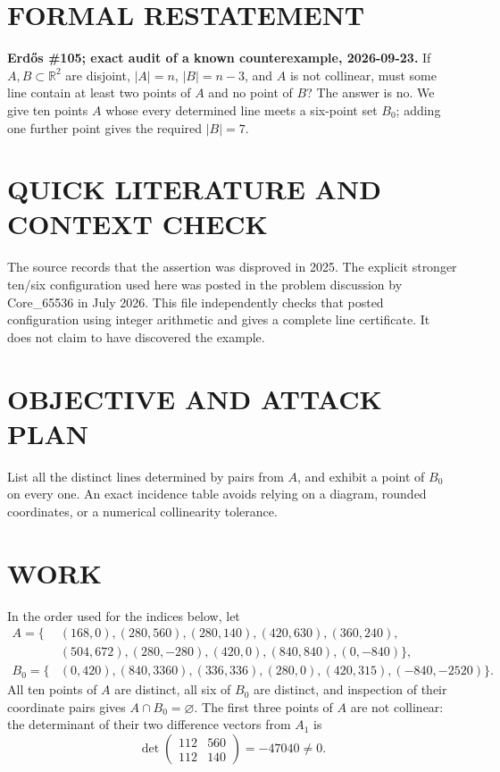 \section{FORMAL RESTATEMENT}
\textbf{Erd\H{o}s \#105; exact audit of a known counterexample, 2026-09-23.}
If $A,B\subset\mathbb R^2$ are disjoint, $|A|=n$, $|B|=n-3$, and $A$ is not collinear, must some line contain at least two points of $A$ and no point of $B$? The answer is no. We give ten points $A$ whose every determined line meets a six-point set $B_0$; adding one further point gives the required $|B|=7$.

\section{QUICK LITERATURE AND CONTEXT CHECK}
The source records that the assertion was disproved in 2025. The explicit stronger ten/six configuration used here was posted in the problem discussion by Core\_65536 in July 2026. This file independently checks that posted configuration using integer arithmetic and gives a complete line certificate. It does not claim to have discovered the example.

\section{OBJECTIVE AND ATTACK PLAN}
List all the distinct lines determined by pairs from $A$, and exhibit a point of $B_0$ on every one. An exact incidence table avoids relying on a diagram, rounded coordinates, or a numerical collinearity tolerance.

\section{WORK}
In the order used for the indices below, let
\[
\begin{aligned}
A=\{&(168,0),(280,560),(280,140),(420,630),(360,240),\\
 &(504,672),(280,-280),(420,0),(840,840),(0,-840)\},\\
B_0=\{&(0,420),(840,3360),(336,336),(280,0),(420,315),(-840,-2520)\}.
\end{aligned}
\tag{1}
\]
All ten points of $A$ are distinct, all six of $B_0$ are distinct, and inspection of their coordinate pairs gives $A\cap B_0=\varnothing$. The first three points of $A$ are not collinear: the determinant of their two difference vectors from $A_1$ is
\[
\det\begin{pmatrix}112&560\\112&140\end{pmatrix}=-47040\ne0.
\]


